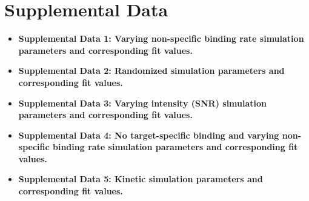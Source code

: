 \section{Supplemental Data}

\begin{itemize}
    \item \textbf{Supplemental Data 1: Varying non-specific binding rate simulation parameters and corresponding fit values.}

    \item \textbf{Supplemental Data 2: Randomized simulation parameters and corresponding fit values.}

    \item \textbf{Supplemental Data 3: Varying intensity (SNR) simulation parameters and corresponding fit values.}

    \item \textbf{Supplemental Data 4: No target-specific binding and varying non-specific binding rate simulation parameters and corresponding fit values.}

    \item \textbf{Supplemental Data 5: Kinetic simulation parameters and corresponding fit values.}
\end{itemize}